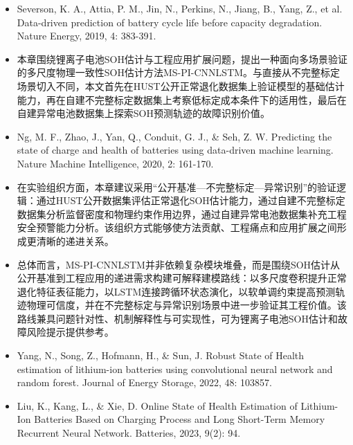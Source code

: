 \documentclass[12pt, a4paper]{ctexart}
\begin{document}
\begin{itemize}
  \item Severson, K. A., Attia, P. M., Jin, N., Perkins, N., Jiang, B., Yang, Z., et al. Data-driven prediction of battery cycle life before capacity degradation. Nature Energy, 2019, 4: 383-391.
\end{itemize}
\begin{itemize}
  \item 本章围绕锂离子电池SOH估计与工程应用扩展问题，提出一种面向多场景验证的多尺度物理一致性SOH估计方法MS-PI-CNNLSTM。与直接从不完整标定场景切入不同，本文首先在HUST公开正常退化数据集上验证模型的基础估计能力，再在自建不完整标定数据集上考察低标定成本条件下的适用性，最后在自建异常电池数据集上探索SOH预测轨迹的故障识别价值。
\end{itemize}
\begin{itemize}
  \item Ng, M. F., Zhao, J., Yan, Q., Conduit, G. J., \& Seh, Z. W. Predicting the state of charge and health of batteries using data-driven machine learning. Nature Machine Intelligence, 2020, 2: 161-170.
\end{itemize}
\begin{itemize}
  \item 在实验组织方面，本章建议采用“公开基准—不完整标定—异常识别”的验证逻辑：通过HUST公开数据集评估正常退化SOH估计能力，通过自建不完整标定数据集分析监督密度和物理约束作用边界，通过自建异常电池数据集补充工程安全预警能力分析。该组织方式能够使方法贡献、工程痛点和应用扩展之间形成更清晰的递进关系。
\end{itemize}
\begin{itemize}
  \item 总体而言，MS-PI-CNNLSTM并非依赖复杂模块堆叠，而是围绕SOH估计从公开基准到工程应用的递进需求构建可解释建模路线：以多尺度卷积提升正常退化特征表征能力，以LSTM连接跨循环状态演化，以软单调约束提高预测轨迹物理可信度，并在不完整标定与异常识别场景中进一步验证其工程价值。该路线兼具问题针对性、机制解释性与可实现性，可为锂离子电池SOH估计和故障风险提示提供参考。
\end{itemize}
\begin{itemize}
  \item Yang, N., Song, Z., Hofmann, H., \& Sun, J. Robust State of Health estimation of lithium-ion batteries using convolutional neural network and random forest. Journal of Energy Storage, 2022, 48: 103857.
\end{itemize}
\begin{itemize}
  \item Liu, K., Kang, L., \& Xie, D. Online State of Health Estimation of Lithium-Ion Batteries Based on Charging Process and Long Short-Term Memory Recurrent Neural Network. Batteries, 2023, 9(2): 94.
\end{itemize}
\end{document}
